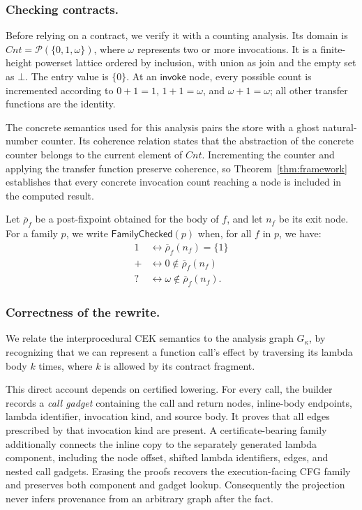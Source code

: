 \documentclass[runningheads]{llncs}
\newcommand{\Cnt}{\mathit{Cnt}}
\newcommand{\kinvoke}{\mathsf{invoke}}
\newcommand{\FamilyChecked}{\mathsf{FamilyChecked}}
\newcommand{\Gk}{G_\kappa}
\begin{document}
\subsubsection{Checking contracts.}
Before relying on a contract, we verify it with a counting analysis. Its domain is $\Cnt = \mathcal{P}(\{0, 1, \omega\})$, where $\omega$ represents two or more invocations. It is a finite-height powerset lattice ordered by inclusion, with union as join and the empty set as $\bot$. The entry value is $\{0\}$. At an $\kinvoke$ node, every possible count is incremented according to $0 + 1 = 1$, $1 + 1 = \omega$, and $\omega + 1 = \omega$; all other transfer functions are the identity.

The concrete semantics used for this analysis pairs the store with a ghost natural-number counter. Its coherence relation states that the abstraction of the concrete counter belongs to the current element of $\Cnt$. Incrementing the counter and applying the transfer function preserve coherence, so Theorem~\ref{thm:framework} establishes that every concrete invocation count reaching a node is included in the computed result.

Let $\overline{\rho}_f$ be a post-fixpoint obtained for the body of $f$, and let $n_f$ be its exit node. For a family $p$, we write $\FamilyChecked(p)$ when, for all $f$ in $p$, we have:
\begin{align*}
  1 & \leftrightarrow \overline{\rho}_f(n_f) = \{1\} \\
  + & \leftrightarrow 0 \notin \overline{\rho}_f(n_f) \\
  ? & \leftrightarrow \omega \notin \overline{\rho}_f(n_f).
\end{align*}

\subsubsection{Correctness of the rewrite.}
We relate the interprocedural CEK semantics to the analysis graph $\Gk$, by recognizing that we can represent a function call's effect by traversing its lambda body $k$ times, where $k$ is allowed by its contract fragment.

This direct account depends on certified lowering. For every call, the builder records a \emph{call gadget} containing the call and return nodes, inline-body endpoints, lambda identifier, invocation kind, and source body. It proves that all edges prescribed by that invocation kind are present. A certificate-bearing family additionally connects the inline copy to the separately generated lambda component, including the node offset, shifted lambda identifiers, edges, and nested call gadgets. Erasing the proofs recovers the execution-facing CFG family and preserves both component and gadget lookup. Consequently the projection never infers provenance from an arbitrary graph after the fact.
\end{document}
